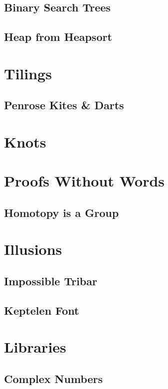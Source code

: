 \documentclass{article}
\begin{document}
\subsection{Binary Search Trees}
\subsection{Heap from Heapsort}
\section{Tilings}
\subsection{Penrose Kites \& Darts}
\section{Knots}
\section{Proofs Without Words}
\subsection{Homotopy is a Group}
\section{Illusions}
\subsection{Impossible Tribar}
\subsection{Keptelen Font}
\section{Libraries}
\subsection{Complex Numbers}
\end{document}
